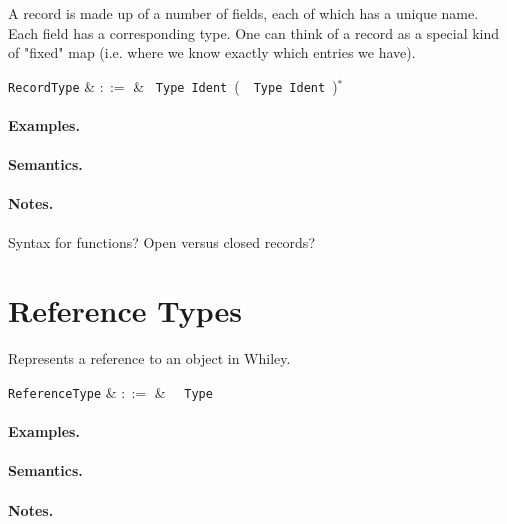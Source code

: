 A record is made up of a number of fields, each of which has a unique name. Each field has a corresponding type. One can think of a record as a special kind of "fixed" map (i.e. where we know exactly which entries we have).

\begin{syntax}
  \verb+RecordType+ & $::=$ & \token{\{}\ \verb+Type+\
  \verb+Ident+\ \big(\ \token{,}\ \verb+Type+\ \verb+Ident+\
  \big)$^*$ \ \token{\}}\\
\end{syntax}

\paragraph{Examples.}

\paragraph{Semantics.}

\paragraph{Notes.}  Syntax for functions?  Open versus closed records?


\section{Reference Types}

Represents a reference to an object in Whiley.

\begin{syntax}
  \verb+ReferenceType+ & $::=$ & \token{\&}\ \ \verb+Type+\\
\end{syntax}

\paragraph{Examples.}

\paragraph{Semantics.}

\paragraph{Notes.}

